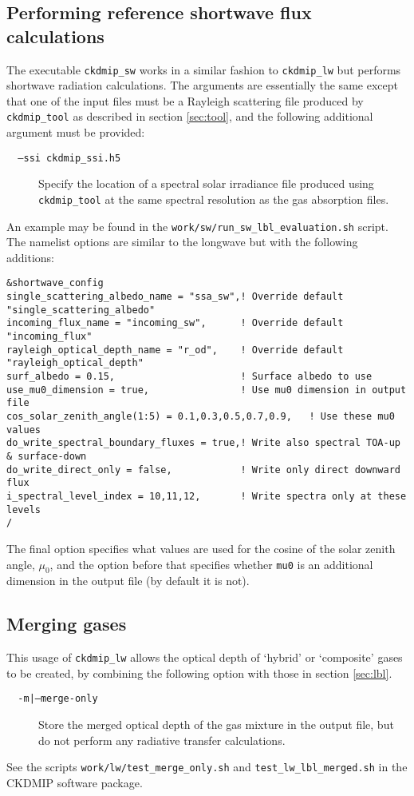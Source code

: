 \documentclass[twoside]{article}
\def\codesize{\small}
\def\code#1{{\codesize\texttt{#1}}}
\def\citem#1{\item[{\codesize\texttt{#1}}]}
\begin{document}
\subsection{Performing reference shortwave flux calculations}
\label{sec:lbl_sw}
The executable \code{ckdmip\_sw} works in a similar fashion to
\code{ckdmip\_lw} but performs shortwave radiation calculations. The
arguments are essentially the same except that one of the input files
must be a Rayleigh scattering file produced by \code{ckdmip\_tool} as
described in section \ref{sec:tool}, and the following additional
argument must be provided:
\begin{description}
\citem{~~--ssi ckdmip\_ssi.h5} Specify the location of a spectral
solar irradiance file produced using \code{ckdmip\_tool} at the same
spectral resolution as the gas absorption files.
\end{description}
An example may be found in the
\code{work/sw/run\_sw\_lbl\_evaluation.sh} script. The namelist
options are similar to the longwave but with the following additions:
\begin{verbatim}
&shortwave_config
single_scattering_albedo_name = "ssa_sw",! Override default "single_scattering_albedo"
incoming_flux_name = "incoming_sw",      ! Override default "incoming_flux"
rayleigh_optical_depth_name = "r_od",    ! Override default "rayleigh_optical_depth"
surf_albedo = 0.15,                      ! Surface albedo to use
use_mu0_dimension = true,                ! Use mu0 dimension in output file
cos_solar_zenith_angle(1:5) = 0.1,0.3,0.5,0.7,0.9,   ! Use these mu0 values
do_write_spectral_boundary_fluxes = true,! Write also spectral TOA-up & surface-down
do_write_direct_only = false,            ! Write only direct downward flux
i_spectral_level_index = 10,11,12,       ! Write spectra only at these levels
/
\end{verbatim}
The final option specifies what values are used for the cosine of the
solar zenith angle, $\mu_0$, and the option before that specifies
whether \code{mu0} is an additional dimension in the output file (by
default it is not).

\subsection{Merging gases}
\label{sec:merge}
This usage of \code{ckdmip\_lw} allows the optical depth of
`hybrid' or `composite' gases to be created, by combining the
following option with those in section \ref{sec:lbl}.
%
\begin{description}
\citem{~~-m|--merge-only} Store the merged optical depth of the gas
mixture in the output file, but do not perform any radiative transfer
calculations.
\end{description}
%
See the scripts \code{work/lw/test\_merge\_only.sh} and
\code{test\_lw\_lbl\_merged.sh} in the CKDMIP software package.
\end{document}
